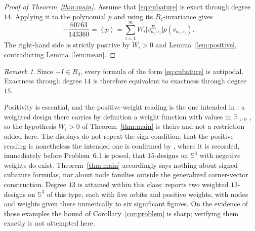\documentclass[11pt]{amsart}
\theoremstyle{remark}
\newtheorem{remark}[theorem]{Remark}
\newcommand{\Sph}{\mathbb{S}}
\newcommand{\mean}[1]{\left\langle #1\right\rangle}
\begin{document}
\begin{proof}[Proof of Theorem~\ref{thm:main}]
Assume that \eqref{eq:cubature} is exact through degree $14$. Applying
it to the polynomial $p$ and using its $B_4$-invariance gives
\[
-\frac{60763}{143360}
=
\mean{p}
=
\sum_{i=1}^{m}
W_i\lvert v_{a_i,s_i}^{B_4}\rvert p(v_{a_i,s_i}).
\]
The right-hand side is strictly positive by $W_i>0$ and
Lemma~\ref{lem:positive}, contradicting Lemma~\ref{lem:mean}.
\end{proof}

\begin{remark}
Since $-I\in B_4$, every formula of the form \eqref{eq:cubature} is
antipodal. Exactness through degree $14$ is therefore equivalent to
exactness through degree $15$.

Positivity is essential, and the positive-weight reading is the one
intended in \cite{TTHS}: a weighted design there carries by definition a
weight function with values in $\mathbb{R}_{>0}$
\cite[Definition~2.2]{TTHS}, so the hypothesis $W_i>0$ of
Theorem~\ref{thm:main} is theirs and not a restriction added here. The
displays \cite[(1) and~(11)]{TTHS} do not repeat the sign condition; that
the positive reading is nonetheless the intended one is confirmed by
\cite[\S6]{TTHS}, where it is recorded, immediately before Problem~6.1
is posed, that $15$-designs on $\Sph^3$ with negative weights do exist.
Theorem~\ref{thm:main} accordingly says nothing about signed cubature
formulas, nor about node families outside the generalized corner-vector
construction. Degree $13$ is attained within this class: \cite[\S6]{TTHS}
reports two weighted $13$-designs on $\Sph^3$ of this type, each with
five orbits and positive weights, with nodes and weights given there
numerically to six significant figures. On the evidence of those
examples the bound of Corollary~\ref{cor:problem} is sharp; verifying
them exactly is not attempted here.
\end{remark}
\end{document}
